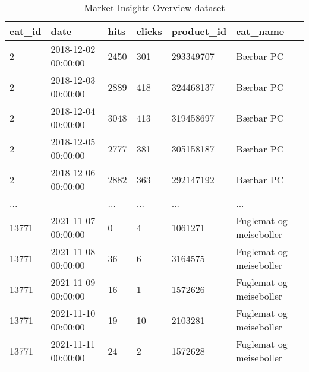 \begin{table}[h]
\centering
\caption{Market Insights Overview dataset}
\label{table:market_insights_overview_11-12-21}
\begin{tabular}{llllll}
\toprule
cat\_id &                date & hits & clicks & product\_id &                cat\_name \\
\midrule
     2 & 2018-12-02 00:00:00 & 2450 &    301 &  293349707 &               Bærbar PC \\
     2 & 2018-12-03 00:00:00 & 2889 &    418 &  324468137 &               Bærbar PC \\
     2 & 2018-12-04 00:00:00 & 3048 &    413 &  319458697 &               Bærbar PC \\
     2 & 2018-12-05 00:00:00 & 2777 &    381 &  305158187 &               Bærbar PC \\
     2 & 2018-12-06 00:00:00 & 2882 &    363 &  292147192 &               Bærbar PC \\
   ... &                     &  ... &    ... &        ... &                     ... \\
 13771 & 2021-11-07 00:00:00 &    0 &      4 &    1061271 & Fuglemat og meiseboller \\
 13771 & 2021-11-08 00:00:00 &   36 &      6 &    3164575 & Fuglemat og meiseboller \\
 13771 & 2021-11-09 00:00:00 &   16 &      1 &    1572626 & Fuglemat og meiseboller \\
 13771 & 2021-11-10 00:00:00 &   19 &     10 &    2103281 & Fuglemat og meiseboller \\
 13771 & 2021-11-11 00:00:00 &   24 &      2 &    1572628 & Fuglemat og meiseboller \\
\bottomrule
\end{tabular}
\end{table}
